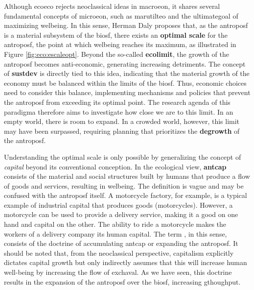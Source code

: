\documentclass[./main_en.tex]{subfiles}
\begin{document}
\par Although \gls{ecoeco} rejects neoclassical ideas in \gls{macroeon}, it shares several fundamental concepts of \gls{microeon}, such as \gls{marutilteo} and the \gls{ultimategoal} of maximizing \gls{welbeing}. In this sense, Herman Daly \cite{Daly2015a} proposes that, as the \gls{antroposf} is a material sub\gls{system} of the \gls{biosf}, there exists an \textbf{optimal scale} for the \gls{antroposf}, the point at which \gls{welbeing} reaches its maximum, as illustrated in Figure \ref{fig:eco:escaleopt}. Beyond the so-called \textbf{\gls{ecolimit}}, the growth of the \gls{antroposf} becomes anti-economic, generating increasing detriments. The concept of \textbf{\gls{sustdev}} is directly tied to this idea, indicating that the material growth of the economy must be balanced within the limits of the \gls{biosf}. Thus, economic choices need to consider this balance, implementing mechanisms and policies that prevent the \gls{antroposf} from exceeding its optimal point. The research agenda of this \gls{paradigma} therefore aims to investigate how close we are to this limit. In an empty world, there is room to expand. In a crowded world, however, this limit may have been surpassed, requiring planning that prioritizes the \textbf{degrowth} of the \gls{antroposf}.

\par Understanding the optimal scale is only possible by generalizing the concept of \textit{capital} beyond its conventional conception. In the ecological view, \textbf{\gls{antcap}} consists of the material and social structures built by humans that produce a flow of goods and services, resulting in \gls{welbeing}. The definition is vague and may be confused with the \gls{antroposf} itself. A motorcycle factory, for example, is a typical example of industrial capital that produces goods (motorcycles). However, a motorcycle can be used to provide a delivery service, making it a good on one hand and capital on the other. The ability to ride a motorcycle makes the workers of a delivery company its human capital. The term , in this sense, consists of the doctrine of accumulating \gls{antcap} or expanding the \gls{antroposf}. It should be noted that, from the neoclassical perspective, capitalism explicitly dictates capital growth but only indirectly assumes that this will increase human well-being by increasing the flow of \gls{exchaval}. As we have seen, this doctrine results in the expansion of the \gls{antroposf} over the \gls{biosf}, increasing \gls{gthoughput}.
\end{document}

